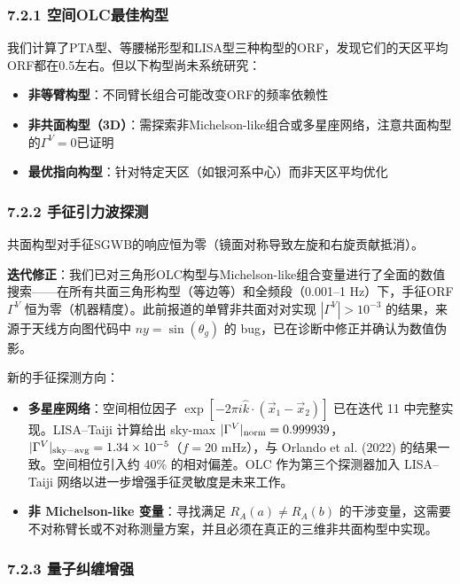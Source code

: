 \documentclass[12pt,a4paper]{article}
\begin{document}
\subsubsection{7.2.1 空间OLC最佳构型}


我们计算了PTA型、等腰梯形型和LISA型三种构型的ORF，发现它们的天区平均ORF都在0.5左右。但以下构型尚未系统研究：

\begin{itemize}
  \item \textbf{非等臂构型}：不同臂长组合可能改变ORF的频率依赖性
  \item \textbf{非共面构型（3D）}：需探索非Michelson-like组合或多星座网络，注意共面构型的$\Gamma^V=0$已证明
  \item \textbf{最优指向构型}：针对特定天区（如银河系中心）而非天区平均优化
\end{itemize}

\subsubsection{7.2.2 手征引力波探测}


共面构型对手征SGWB的响应恒为零（镜面对称导致左旋和右旋贡献抵消）。

\textbf{迭代修正}：我们已对三角形OLC构型与Michelson-like组合变量进行了全面的数值搜索——在所有共面三角形构型（等边等）和全频段（0.001–1 Hz）下，手征ORF $\Gamma^V$ 恒为零（机器精度）。此前报道的单臂非共面对对实现 $|\Gamma^V| > 10^{-3}$ 的结果，来源于天线方向图代码中 $ny = \sin(\theta_g)$ 的 bug，已在诊断中修正并确认为数值伪影。

新的手征探测方向：
\begin{itemize}
  \item \textbf{多星座网络}：空间相位因子 $\exp[-2\pi i \hat{k}\cdot(\vec{x}_1 - \vec{x}_2)]$ 已在迭代 11 中完整实现。LISA--Taiji 计算给出 sky-max $|\Gamma^V|_{\rm norm} = 0.999939$，$|\Gamma^V|_{\rm sky-avg} = 1.34 \times 10^{-5}$（$f = 20$ mHz），与 Orlando et al. (2022) 的结果一致。空间相位引入约 $40\%$ 的相对偏差。OLC 作为第三个探测器加入 LISA--Taiji 网络以进一步增强手征灵敏度是未来工作。
  \item \textbf{非 Michelson-like 变量}：寻找满足 $R_A(a) \neq R_A(b)$ 的干涉变量，这需要不对称臂长或不对称测量方案，并且必须在真正的三维非共面构型中实现。

\end{itemize}
\subsubsection{7.2.3 量子纠缠增强}
\end{document}
